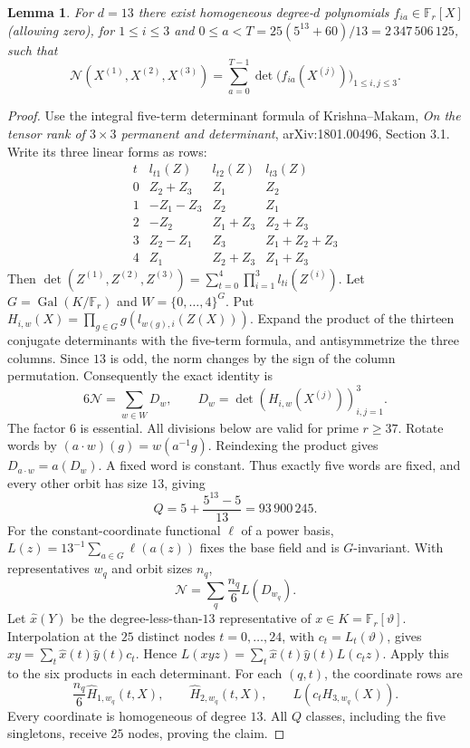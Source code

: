 \documentclass[11pt]{article}
\newtheorem{lemma}{Lemma}
\begin{document}
\begin{lemma}\label{rankfive:decomposition}
For $d=13$ there exist homogeneous degree-$d$ polynomials
$f_{ia}\in\mathbb F_r[X]$ (allowing zero), for $1\le i\le3$ and
$0\le a<T=25(5^{13}+60)/13=2\,347\,506\,125$, such that
\begin{equation}\label{rankfive:determinant-sum}
 \mathcal N(X^{(1)},X^{(2)},X^{(3)})
 =\sum_{a=0}^{T-1}\det\bigl(f_{ia}(X^{(j)})\bigr)_{1\le i,j\le3}.
\end{equation}
\end{lemma}
\begin{proof}
Use the integral five-term determinant formula of Krishna--Makam,
\emph{On the tensor rank of $3\times3$ permanent and determinant},
arXiv:1801.00496, Section 3.1. Write its three linear forms as rows:
\[
\begin{array}{c|ccc}
t&l_{t1}(Z)&l_{t2}(Z)&l_{t3}(Z)\\\hline
0&Z_2+Z_3&Z_1&Z_2\\
1&-Z_1-Z_3&Z_2&Z_1\\
2&-Z_2&Z_1+Z_3&Z_2+Z_3\\
3&Z_2-Z_1&Z_3&Z_1+Z_2+Z_3\\
4&Z_1&Z_2+Z_3&Z_1+Z_3
\end{array}
\]
Then $\det(Z^{(1)},Z^{(2)},Z^{(3)})
=\sum_{t=0}^4\prod_{i=1}^3 l_{ti}(Z^{(i)})$.
Let $G=\operatorname{Gal}(K/\mathbb F_r)$ and $W=\{0,\ldots,4\}^G$.
Put $H_{i,w}(X)=\prod_{g\in G}g(l_{w(g),i}(Z(X)))$.
Expand the product of the thirteen conjugate determinants with the
five-term formula, and antisymmetrize the three columns. Since $13$
is odd, the norm changes by the sign of the column permutation.
Consequently the exact identity is
\[
 6\mathcal N=\sum_{w\in W}D_w,\qquad
 D_w=\det(H_{i,w}(X^{(j)}))_{i,j=1}^3.
\]
The factor $6$ is essential. All divisions below are valid for prime
$r\ge37$. Rotate words by $(a\cdot w)(g)=w(a^{-1}g)$.
Reindexing the product gives $D_{a\cdot w}=a(D_w)$.
A fixed word is constant. Thus exactly five words are fixed, and
every other orbit has size $13$, giving
\[
 Q=5+\frac{5^{13}-5}{13}=93\,900\,245.
\]
For the constant-coordinate functional $\ell$ of a power basis,
$L(z)=13^{-1}\sum_{a\in G}\ell(a(z))$ fixes the base field and is
$G$-invariant. With representatives $w_q$ and orbit sizes $n_q$,
\[
 \mathcal N=\sum_q \frac{n_q}{6}L(D_{w_q}).
\]
Let $\widehat x(Y)$ be the degree-less-than-$13$ representative of
$x\in K=\mathbb F_r[\vartheta]$. Interpolation at the $25$ distinct
nodes $t=0,\ldots,24$, with $c_t=L_t(\vartheta)$, gives
$xy=\sum_t\widehat x(t)\widehat y(t)c_t$.
Hence $L(xyz)=\sum_t\widehat x(t)\widehat y(t)L(c_tz)$.
Apply this to the six products in each determinant. For each $(q,t)$,
the coordinate rows are
\[
 \frac{n_q}{6}\widehat H_{1,w_q}(t,X),\qquad
 \widehat H_{2,w_q}(t,X),\qquad L(c_tH_{3,w_q}(X)).
\]
Every coordinate is homogeneous of degree $13$. All $Q$ classes,
including the five singletons, receive $25$ nodes, proving the claim.
\end{proof}
\end{document}
